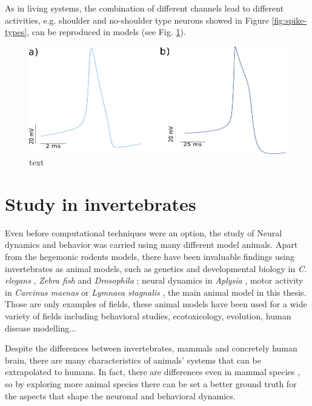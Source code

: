 As in living systems, the combination of different channels lead to different activities, e.g. shoulder and no-shoulder type neurons showed in Figure \ref{fig:spike-types}, can be reproduced in models (see Fig. \ref{fig:spike-types model}). 

\begin{figure}[htb!]
	\includegraphics[width=\textwidth]{img/intro/spike-types model.pdf}
	\caption{text}
	\label{fig:spike-types model}
\end{figure}



\section{Study in invertebrates}
Even before computational techniques were an option, the study of Neural dynamics and behavior was carried using many different model animals. Apart from the hegemonic rodents models, there have been invaluable findings using invertebrates as animal models, such as genetics and developmental biology in \textit{C. elegans} \parencite{brenner_genetics_1974}, \textit{Zebra fish} \parencite{streisinger_production_1981} and \textit{Drosophila} \parencite{nusslein-volhard_mutations_1980}; neural dynamics in \textit{Aplysia} \parencite{HODGKIN1952,wachtel_direct_1967}, motor activity in \textit{Carcinus maenas} \parencite{eisen_mechanisms_1982} or \textit{Lymnaea stagnalis} \parencite{Benjamin1979b}, the main animal model in this thesis. Those are only examples of fields, these animal models have been used for a wide variety of fields including behavioral studies, ecotoxicology, evolution, human disease modelling... \parencite{romanova_animal_2018} 

Despite the differences between invertebrates, mammals and concretely human brain, there are many characteristics of animals' systems that can be extrapolated to humans. In fact, there are differences even in mammal species \parencite{preuss_taking_2000}, so by exploring more animal species there can be set a better ground truth for the aspects that shape the neuronal and behavioral dynamics. 

